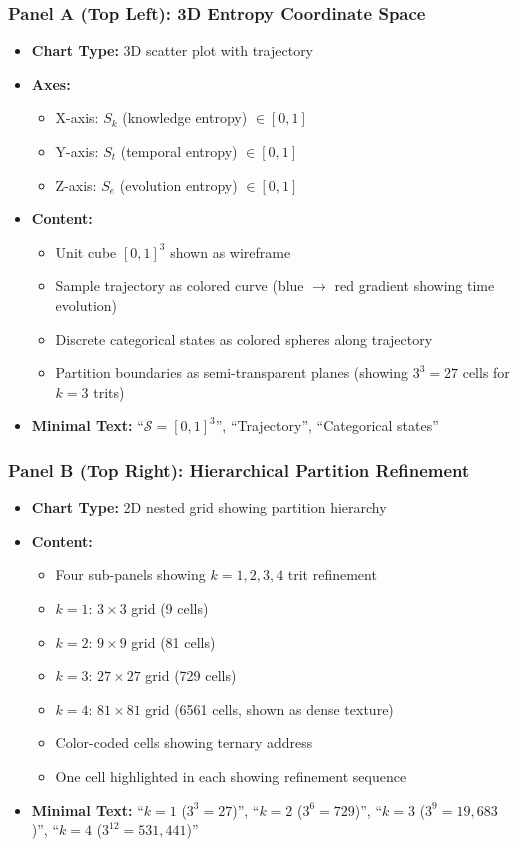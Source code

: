 \subsubsection*{Panel A (Top Left): 3D Entropy Coordinate Space}
\begin{itemize}
\item \textbf{Chart Type:} 3D scatter plot with trajectory
\item \textbf{Axes:}
  \begin{itemize}
  \item X-axis: $S_k$ (knowledge entropy) $\in [0,1]$
  \item Y-axis: $S_t$ (temporal entropy) $\in [0,1]$
  \item Z-axis: $S_e$ (evolution entropy) $\in [0,1]$
  \end{itemize}
\item \textbf{Content:}
  \begin{itemize}
  \item Unit cube $[0,1]^3$ shown as wireframe
  \item Sample trajectory as colored curve (blue $\to$ red gradient showing time evolution)
  \item Discrete categorical states as colored spheres along trajectory
  \item Partition boundaries as semi-transparent planes (showing $3^3 = 27$ cells for $k=3$ trits)
  \end{itemize}
\item \textbf{Minimal Text:} ``$\mathcal{S} = [0,1]^3$'', ``Trajectory'', ``Categorical states''
\end{itemize}

\subsubsection*{Panel B (Top Right): Hierarchical Partition Refinement}
\begin{itemize}
\item \textbf{Chart Type:} 2D nested grid showing partition hierarchy
\item \textbf{Content:}
  \begin{itemize}
  \item Four sub-panels showing $k = 1, 2, 3, 4$ trit refinement
  \item $k=1$: $3 \times 3$ grid (9 cells)
  \item $k=2$: $9 \times 9$ grid (81 cells)
  \item $k=3$: $27 \times 27$ grid (729 cells)
  \item $k=4$: $81 \times 81$ grid (6561 cells, shown as dense texture)
  \item Color-coded cells showing ternary address
  \item One cell highlighted in each showing refinement sequence
  \end{itemize}
\item \textbf{Minimal Text:} ``$k=1$ ($3^3=27$)'', ``$k=2$ ($3^6=729$)'', ``$k=3$ ($3^9=19{,}683$)'', ``$k=4$ ($3^{12}=531{,}441$)''
\end{itemize}

